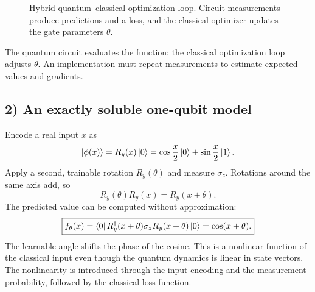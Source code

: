 \begin{figure}[htbp]\centering
{}
\caption{Hybrid quantum--classical optimization loop. Circuit measurements produce predictions and a loss, and the classical optimizer updates the gate parameters $\theta$.}\label{fig:qml-optimization-loop}
\end{figure}
The quantum circuit evaluates the function; the classical optimization loop adjusts $\theta$. An implementation must repeat measurements to estimate expected values and gradients.

\subsection*{2) An exactly soluble one-qubit model}
Encode a real input $x$ as
\begin{equation}
\left|\phi(x)\right\rangle=R_y(x)\left|0\right\rangle=
\cos\frac x2\left|0\right\rangle+\sin\frac x2\left|1\right\rangle.
\end{equation}
Apply a second, trainable rotation $R_y(\theta)$ and measure $\sigma_z$. Rotations around the same axis add, so
\begin{equation}
R_y(\theta)R_y(x)=R_y(x+\theta).
\end{equation}
The predicted value can be computed without approximation:
\begin{equation}\label{eq:qnn-onequbit}
\boxed{f_\theta(x)=\left\langle0\right| R_y^\dagger(x+\theta)\sigma_z R_y(x+\theta)\left|0\right\rangle
=\cos(x+\theta).}
\end{equation}
The learnable angle shifts the phase of the cosine. This is a nonlinear function of the classical input even though the quantum dynamics is linear in state vectors. The nonlinearity is introduced through the input encoding and the measurement probability, followed by the classical loss function.

